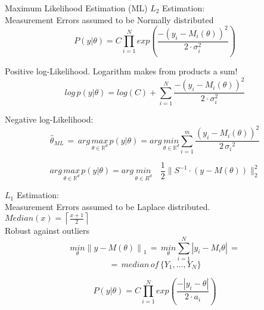 \begin{tcolorbox}[colback=yellow!5!white,colframe=yellow!75!white,coltitle=black,title=Maximum Likelihood Estimation]
Maximum Likelihood Estimation (ML) \({L}_{2}\) Estimation:\\
Measurement Errors assumed to be Normally distributed
\begin{equation*}
{ P(y|\theta ) }=C\prod _{ i=1 }^{ N }{ exp(\frac { -(y_{ i }-M_{ i }(\theta ))^{ 2 } }{ 2\cdot \sigma _{ i }^{ 2 } } )} 
\end{equation*}

Positive log-Likelihood. Logarithm makes from products a sum!
\begin{equation*}
{ log \, p(y|\theta ) } = log(C) +\sum _{ i=1 }^{ N }{ { \frac { -(y_{ i }-M_{ i }(\theta ))^{ 2 } }{ 2 \cdot \sigma _{ i }^{ 2 } }  } } 
\end{equation*}

Negative log-Likelihood:
\begin{equation*}
\hat{\theta}_{ML} \, = \, arg \, \underset { \theta \in { \mathbb{R} }^{ d } }{ max } \, p(y|\theta ) = arg \, \underset { \theta \in { \mathbb{R} }^{ d } }{ min }  \sum _{ i=1 }^{ m }{ \frac { (y_{ i }-M_{ i }(\theta ))^{ 2 } }{ 2\, { \sigma _{ i } }^{ 2 } }  } 
\end{equation*}

\begin{equation*}
arg \, \underset{ \theta \in \mathbb{ R }^{ d } }{ max } \, p(y|\theta ) = arg \, \underset { \theta \in {  R }^{ d } }{ min } \quad \frac{1}{2} \parallel S^{ -1 }\cdot (y-M(\theta )){ \parallel  }_{ 2 }^{ 2 }
\end{equation*}

\({L}_{1}\) Estimation:\\
Measurement Errors assumed to be Laplace distributed.\\ \(Median(x)=\left\lceil \frac { x + 1 }{ 2 }  \right\rceil \)\\
Robust against outliers
\begin{equation*}
\underset { \theta  }{ min } { \parallel y-M(\theta )\parallel  }_{ 1 }\,=\,\underset { \theta  }{ min } \sum _{ i=1 }^{ N }{ |{ y }_{ i }-{ M }_{ i }\theta | } \,=
\end{equation*}
\begin{equation*}
=\,median\,of\,\{{Y}_{1},...,{Y}_{N}\}
\end{equation*}

\begin{equation*}
{ P(y|\theta ) }=C\prod _{ i=1 }^{ N }{ { exp }(\frac { -|{ y }_{ i }-\theta | }{ 2\cdot { a }_{ i } } ) } 
\end{equation*} 
\end{tcolorbox}

